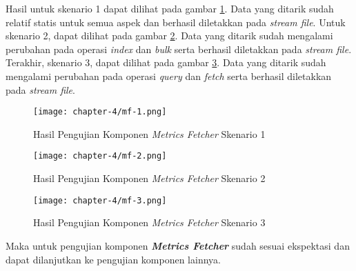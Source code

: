 Hasil untuk skenario 1 dapat dilihat pada gambar \ref{fig:mf-1}. Data yang ditarik sudah relatif statis untuk semua aspek dan berhasil diletakkan pada \textit{stream file}. Untuk skenario 2, dapat dilihat pada gambar \ref{fig:mf-2}. Data yang ditarik sudah mengalami perubahan pada operasi \textit{index} dan \textit{bulk} serta berhasil diletakkan pada \textit{stream file}. Terakhir, skenario 3, dapat dilihat pada gambar \ref{fig:mf-3}. Data yang ditarik sudah mengalami perubahan pada operasi \textit{query} dan \textit{fetch} serta berhasil diletakkan pada \textit{stream file}.

\begin{figure}[h]
    \centering
    \texttt{[image: chapter-4/mf-1.png]}
    \caption{Hasil Pengujian Komponen \textit{Metrics Fetcher} Skenario 1}
    \label{fig:mf-1}
\end{figure}

\begin{figure}[h]
    \centering
    \texttt{[image: chapter-4/mf-2.png]}
    \caption{Hasil Pengujian Komponen \textit{Metrics Fetcher} Skenario 2}
    \label{fig:mf-2}
\end{figure}

\begin{figure}[h]
    \centering
    \texttt{[image: chapter-4/mf-3.png]}
    \caption{Hasil Pengujian Komponen \textit{Metrics Fetcher} Skenario 3}
    \label{fig:mf-3}
\end{figure}

Maka untuk pengujian komponen \textbf{\textit{Metrics Fetcher}} sudah sesuai ekspektasi dan dapat dilanjutkan ke pengujian komponen lainnya.